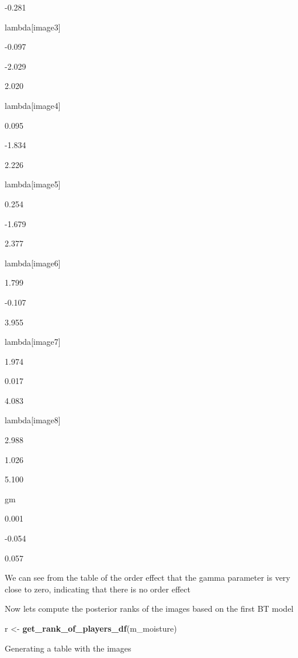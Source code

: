 \documentclass[
]{book}
\newenvironment{Shaded}{\begin{snugshade}}{\end{snugshade}}
\newcommand{\KeywordTok}[1]{\textcolor[rgb]{0.13,0.29,0.53}{\textbf{#1}}}
\newcommand{\NormalTok}[1]{#1}
\newcommand{\StringTok}[1]{\textcolor[rgb]{0.31,0.60,0.02}{#1}}
\begin{document}
-0.281

lambda{[}image3{]}

-0.097

-2.029

2.020

lambda{[}image4{]}

0.095

-1.834

2.226

lambda{[}image5{]}

0.254

-1.679

2.377

lambda{[}image6{]}

1.799

-0.107

3.955

lambda{[}image7{]}

1.974

0.017

4.083

lambda{[}image8{]}

2.988

1.026

5.100

gm

0.001

-0.054

0.057

We can see from the table of the order effect that the gamma parameter is very close to zero, indicating that there is no order effect

Now lets compute the posterior ranks of the images based on the first BT model

\begin{Shaded}
\begin{Highlighting}[]
\NormalTok{r <-}\StringTok{ }\KeywordTok{get_rank_of_players_df}\NormalTok{(m_moisture) }
\end{Highlighting}
\end{Shaded}

Generating a table with the images
\end{document}
